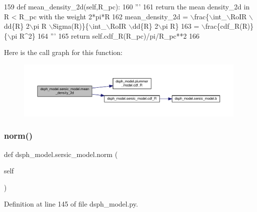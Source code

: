 \begin{DoxyCode}
159     \textcolor{keyword}{def }mean\_density\_2d(self,R\_pc):
160         \textcolor{stringliteral}{'''}
161 \textcolor{stringliteral}{        return the mean density\_2d in R < R\_pc with the weight 2*pi*R}
162 \textcolor{stringliteral}{        mean\_density\_2d = \(\backslash\)frac\{\(\backslash\)int\_\(\backslash\)RoIR \(\backslash\)dd\{R\} 2\(\backslash\)pi R \(\backslash\)Sigma(R)\}\{\(\backslash\)int\_\(\backslash\)RoIR \(\backslash\)dd\{R\} 2\(\backslash\)pi R\}}
163 \textcolor{stringliteral}{            = \(\backslash\)frac\{cdf\_R(R)\}\{\(\backslash\)pi R^2\}}
164 \textcolor{stringliteral}{        '''}
165         \textcolor{keywordflow}{return} self.cdf\_R(R\_pc)/pi/R\_pc**2
166     
\end{DoxyCode}
Here is the call graph for this function\+:\nopagebreak
\begin{figure}[H]
\begin{center}
\leavevmode
\includegraphics[width=350pt]{d0/de9/classdsph__model_1_1sersic__model_a52fb76f30a58833cc14b3c9878ac9b56_cgraph}
\end{center}
\end{figure}
\mbox{\label{classdsph__model_1_1sersic__model_a9af6c3cabf132205c55129bc28b9d867}} 
\subsubsection{\texorpdfstring{norm()}{norm()}}
{\footnotesize\ttfamily def dsph\+\_\+model.\+sersic\+\_\+model.\+norm (\begin{DoxyParamCaption}\item[{}]{self }\end{DoxyParamCaption})}



Definition at line 145 of file dsph\+\_\+model.\+py.



